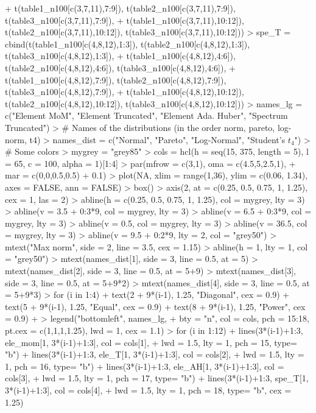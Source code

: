 \documentclass{article}
\begin{document}
\begin{Schunk}
\begin{Sinput}
+                t(table1_n100[c(3,7,11),7:9]), t(table2_n100[c(3,7,11),7:9]), t(table3_n100[c(3,7,11),7:9]),
+                t(table1_n100[c(3,7,11),10:12]), t(table2_n100[c(3,7,11),10:12]), t(table3_n100[c(3,7,11),10:12]))
> spe_T = cbind(t(table1_n100[c(4,8,12),1:3]), t(table2_n100[c(4,8,12),1:3]), t(table3_n100[c(4,8,12),1:3]),
+               t(table1_n100[c(4,8,12),4:6]), t(table2_n100[c(4,8,12),4:6]), t(table3_n100[c(4,8,12),4:6]),
+               t(table1_n100[c(4,8,12),7:9]), t(table2_n100[c(4,8,12),7:9]), t(table3_n100[c(4,8,12),7:9]),
+               t(table1_n100[c(4,8,12),10:12]), t(table2_n100[c(4,8,12),10:12]), t(table3_n100[c(4,8,12),10:12]))
> names_lg = c("Element MoM", "Element Truncated", "Element Ada. Huber", "Spectrum Truncated")
> # Names of the distributions (in the order norm, pareto, log-norm, t4)
> names_dist = c("Normal", "Pareto", "Log-Normal", "Student's $t_4$")
> # Some colors
> mygrey = "grey85"
> cols = hcl(h = seq(15, 375, length = 5), l = 65, c = 100, alpha = 1)[1:4]
> par(mfrow = c(3,1), oma = c(4.5,5,2.5,1),
+     mar = c(0,0,0.5,0.5) + 0.1)
> plot(NA, xlim = range(1,36), ylim = c(0.06, 1.34), axes = FALSE, ann = FALSE)
> box()
> axis(2, at = c(0.25, 0.5, 0.75, 1, 1.25), cex = 1, las = 2)
> abline(h = c(0.25, 0.5, 0.75, 1, 1.25), col = mygrey, lty = 3)
> abline(v = 3.5 + 0:3*9, col = mygrey, lty = 3)
> abline(v = 6.5 + 0:3*9, col = mygrey, lty = 3)
> abline(v = 0.5, col = mygrey, lty = 3)
> abline(v = 36.5, col = mygrey, lty = 3)
> abline(v = 9.5 + 0:2*9, lty = 2, col = "grey50")
> mtext("Max norm", side = 2, line = 3.5, cex = 1.15)
> abline(h = 1, lty = 1, col = "grey50")
> mtext(names_dist[1], side = 3, line = 0.5, at = 5)
> mtext(names_dist[2], side = 3, line = 0.5, at = 5+9)
> mtext(names_dist[3], side = 3, line = 0.5, at = 5+9*2)
> mtext(names_dist[4], side = 3, line = 0.5, at = 5+9*3)
> for (i in 1:4){
+   text(2 + 9*(i-1), 1.25, "Diagonal", cex = 0.9)
+   text(5 + 9*(i-1), 1.25, "Equal", cex = 0.9)
+   text(8 + 9*(i-1), 1.25, "Power", cex = 0.9)
+ }
> legend("bottomleft", names_lg,
+        bty = "n", col = cols, pch = 15:18, pt.cex = c(1,1,1,1.25), lwd = 1, cex = 1.1)
> for (i in 1:12){
+   lines(3*(i-1)+1:3, ele_mom[1, 3*(i-1)+1:3], col = cols[1],
+         lwd = 1.5, lty = 1, pch = 15, type= "b")
+   lines(3*(i-1)+1:3, ele_T[1, 3*(i-1)+1:3], col = cols[2],
+         lwd = 1.5, lty = 1, pch = 16, type= "b")
+   lines(3*(i-1)+1:3, ele_AH[1, 3*(i-1)+1:3], col = cols[3],
+         lwd = 1.5, lty = 1, pch = 17, type= "b")
+   lines(3*(i-1)+1:3, spe_T[1, 3*(i-1)+1:3], col = cols[4],
+         lwd = 1.5, lty = 1, pch = 18, type= "b", cex = 1.25)
}
\end{Sinput}
\end{Schunk}
\end{document}
